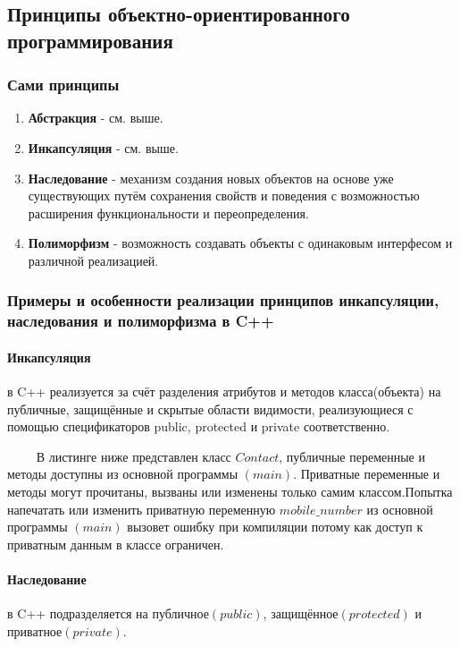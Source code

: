 \subsection{Принципы объектно-ориентированного программирования}
\subsubsection{Сами принципы}
\begin{enumerate}
    \item \textbf{Абстракция} - см. выше.
    \item \textbf{Инкапсуляция} - см. выше.
    \item \begin{definition}\textbf{Наследование} - механизм создания новых объектов на основе уже существующих путём сохранения свойств и поведения с возможностью расширения функциональности и переопределения.\end{definition}
    \item \begin{definition}\textbf{Полиморфизм} - возможность создавать объекты с одинаковым интерфесом и различной реализацией.\end{definition}
\end{enumerate}
\subsubsection{Примеры и особенности реализации принципов инкапсуляции, наследования и полиморфизма в C++}
\paragraph{Инкапсуляция} в C++ реализуется за счёт разделения атрибутов и методов класса(объекта) на публичные, защищённые и скрытые области видимости, реализующиеся с помощью спецификаторов public, protected и private соответственно.

$\qquad$ В листинге ниже представлен класс $Contact$, публичные переменные и методы доступны из основной программы $(main)$. Приватные переменные и методы могут прочитаны, вызваны или изменены только самим классом.Попытка напечатать или изменить приватную переменную $mobile\_number$ из основной программы $(main)$ вызовет ошибку при компиляции потому как доступ к приватным данным в классе ограничен.
\newpage
\lstset{language=C++, keepspaces = true, extendedchars=\false}

\newpage
\paragraph{Наследование} в C++ подразделяется на публичное$(public)$, защищённое$(protected)$ и приватное$(private)$.

